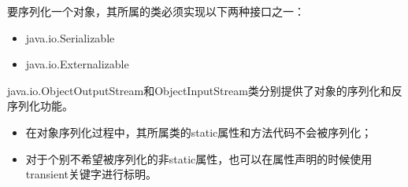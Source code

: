要序列化一个对象，其所属的类必须实现以下两种接口之一：

\begin{itemize}
\item java.io.Serializable
\item java.io.Externalizable
\end{itemize}

java.io.ObjectOutputStream和ObjectInputStream类分别提供了对象的序列化和反序列化功能。


\begin{itemize}\kai
\item 在对象序列化过程中，其所属类的static属性和方法代码不会被序列化；
\item 对于个别不希望被序列化的非static属性，也可以在属性声明的时候使用transient关键字进行标明。
\end{itemize}




